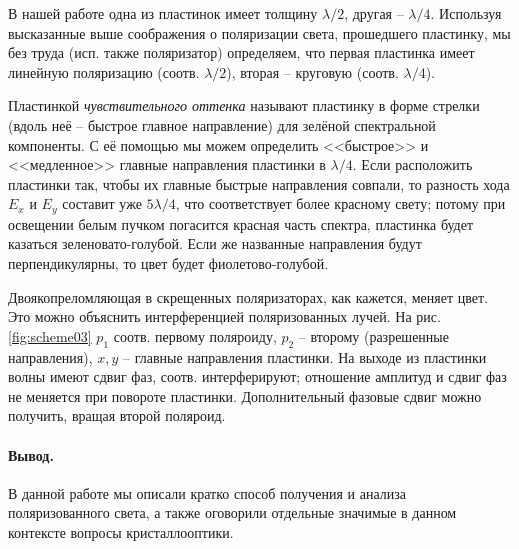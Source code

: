 \documentclass{../lab_class}
\begin{document}
В нашей работе одна из пластинок имеет толщину $\lambda/2$, другая -- $\lambda/4$. Используя высказанные выше соображения о поляризации света, прошедшего пластинку, мы без труда (исп. также поляризатор) определяем, что первая пластинка имеет линейную поляризацию (соотв. $\lambda/2$), вторая -- круговую (соотв. $\lambda/4$).

Пластинкой \emph{чувствительного оттенка} называют пластинку в форме стрелки (вдоль неё -- быстрое главное направление) для зелёной спектральной компоненты. С её помощью мы можем определить <<быстрое>> и <<медленное>> главные направления пластинки в $\lambda/4$. Если расположить пластинки так, чтобы их главные быстрые направления совпали, то разность хода $E_x$ и $E_y$ составит уже $5 \lambda/4$, что соответствует более красному свету; потому при освещении белым пучком погасится красная часть спектра, пластинка будет казаться зеленовато-голубой. Если же названные направления будут перпендикулярны, то цвет будет фиолетово-голубой.

Двоякопреломляющая в скрещенных поляризаторах, как кажется, меняет цвет. Это можно объяснить интерференцией поляризованных лучей. На рис. \ref{fig:scheme03} $p_1$ соотв. первому поляроиду, $p_2$ -- второму (разрешенные направления), $x,y$ -- главные направления пластинки. На выходе из пластинки волны имеют сдвиг фаз, соотв. интерферируют; отношение амплитуд и сдвиг фаз не меняется при повороте пластинки. Дополнительный фазовые сдвиг можно получить, вращая второй поляроид.

\paragraph{Вывод.}
В данной работе мы описали кратко способ получения и анализа поляризованного света, а также оговорили отдельные значимые в данном контексте вопросы кристаллооптики.
\end{document}

